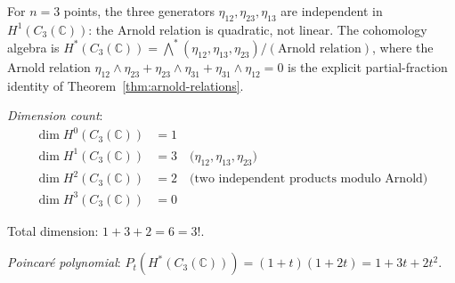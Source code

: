 \begin{example}[\texorpdfstring{$n=3$}{n=3}: the fundamental relation]
\label{ex:arnold-n3-complete}

For $n=3$ points, the three generators $\eta_{12}, \eta_{23}, \eta_{13}$
are independent in $H^1(C_3(\mathbb{C}))$: the Arnold relation is
quadratic, not linear. The cohomology algebra is
$H^*(C_3(\mathbb{C})) = \bigwedge^*(\eta_{12}, \eta_{13}, \eta_{23})
/ (\text{Arnold relation})$, where the Arnold relation
$\eta_{12} \wedge \eta_{23} + \eta_{23} \wedge \eta_{31}
+ \eta_{31} \wedge \eta_{12} = 0$ is the explicit partial-fraction
identity of Theorem~\ref{thm:arnold-relations}.

\emph{Dimension count}:
\begin{align}
\dim H^0(C_3(\mathbb{C})) &= 1\\
\dim H^1(C_3(\mathbb{C})) &= 3 \quad \text{(}\eta_{12}, \eta_{13}, \eta_{23}\text{)}\\
\dim H^2(C_3(\mathbb{C})) &= 2 \quad \text{(two independent products modulo Arnold)}\\
\dim H^3(C_3(\mathbb{C})) &= 0
\end{align}

Total dimension: $1 + 3 + 2 = 6 = 3!$.

\emph{Poincaré polynomial}: $P_t(H^*(C_3(\mathbb{C}))) = (1+t)(1+2t) = 1 + 3t + 2t^2$.
\end{example}

